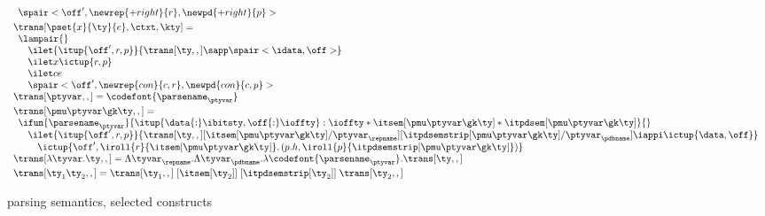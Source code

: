 \begin{figure}
\[\begin{array}{l}
\begin{array}{l}
  {  %
    \def \r {\newrep {+right}{r}}
    \def \p {\newpd {+right}{p}}
    \spair<\off',\r,\p>
  }\\ %
  \end{array}
\\[3pt]
  \trans[\pset{x}{\ty}{e},\ctxt,\kty] = \\
  \begin{array}{l}  
    \lampair{} \\
    \quad \ilet {\itup{\off',r,p}}{\trans[\ty,,] \sapp \spair<\idata,\off>} \\
    \quad \ilet x {\ictup{r,p}}\\
    \quad \ilet c e \\
    \quad \spair<\off',\newrep {con} {c,r},\newpd {con} {c,p}>
  \end{array}
\\[3pt]
\trans[\ptyvar,,] = \codefont{\parsename_\ptyvar}
\\[3pt]
\trans[\pmu \ptyvar \gk \ty,,] = \\
  \begin{array}{l}
  \ifun {\parsename_\ptyvar} {\itup{\data{:}\ibitsty,\off{:}\ioffty}  
           : \ioffty * \itsem[\pmu \ptyvar \gk \ty] 
                    * \itpdsem[\pmu \ptyvar \gk \ty] } {}\\
  \quad \ilet {\itup{\off',r,p}} 
   {\trans[\ty,,][\itsem[\pmu \ptyvar \gk \ty]/\ptyvar_\repname]
          [\itpdsemstrip[\pmu \ptyvar \gk \ty]/\ptyvar_\pdbname] \iappi \ictup{\data,\off}} \\ 
  \qquad \ictup{\off',\iroll{r}{\itsem[\pmu \ptyvar \gk \ty]},
     (p.h,\iroll{p}{\itpdsemstrip[\pmu \ptyvar\gk \ty]})}
  \end{array}  
\\[3pt]
\trans[\lambda\tyvar . \ty,,] = %
    \Lambda \tyvar_\repname. 
    \Lambda \tyvar_\pdbname. \lambda \codefont{\parsename_\ptyvar}. \trans[\ty,,]
\\[3pt]
\trans[\ty_1 \ty_2,,] = 
    \trans[\ty_1,,]\; [\itsem[\ty_2]]\; [\itpdsemstrip[\ty_2]]\; \trans[\ty_2,,]
\\
\end{array}
\]
\caption{\ddc{} parsing semantics, selected constructs}
\label{fig:ddc-sem-sum}
\end{figure}


